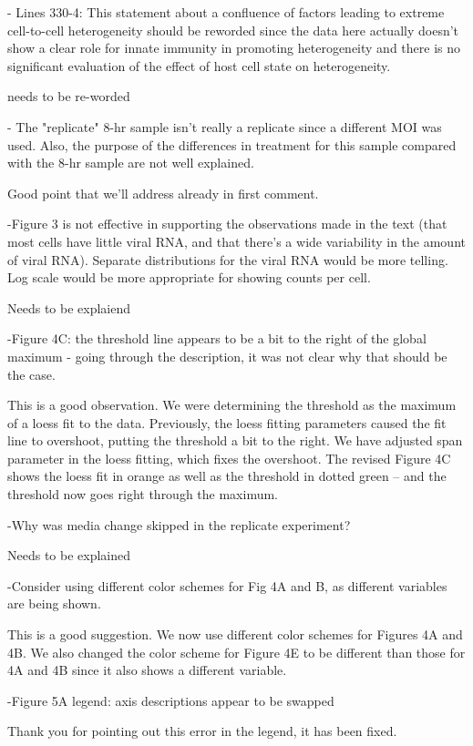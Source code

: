 \documentclass[11pt, oneside]{article}   	%
\begin{document}
- Lines 330-4: This statement about a confluence of factors leading to extreme cell-to-cell heterogeneity should be reworded since the data here actually doesn't show a clear role for innate immunity in promoting heterogeneity and there is no significant evaluation of the effect of host cell state on heterogeneity. 

{\color{red} needs to be re-worded}

- The "replicate" 8-hr sample isn't really a replicate since a different MOI was used. Also, the purpose of the differences in treatment for this sample compared with the 8-hr sample are not well explained. 

{\color{red}
Good point that we'll address already in first comment.}

-Figure 3 is not effective in supporting the observations made in the text (that most cells have little viral RNA, and that there's a wide variability in the amount of viral RNA). Separate distributions for the viral RNA would be more telling. Log scale would be more appropriate for showing counts per cell. 

{\color{red} Needs to be explaiend}

-Figure 4C: the threshold line appears to be a bit to the right of the global maximum - going through the description, it was not clear why that should be the case. 

{\color{black} 
This is a good observation. 
We were determining the threshold as the maximum of a loess fit to the data. 
Previously, the loess fitting parameters caused the fit line to overshoot, putting the threshold a bit to the right.
We have adjusted span parameter in the loess fitting, which fixes the overshoot.
The revised Figure 4C shows the loess fit in orange as well as the threshold in dotted green -- and the threshold now goes right through the maximum.
}

-Why was media change skipped in the replicate experiment? 

{\color{red} Needs to be explained}

-Consider using different color schemes for Fig 4A and B, as different variables are being shown. 

{\color{black} 
This is a good suggestion.
We now use different color schemes for Figures 4A and 4B.
We also changed the color scheme for Figure 4E to be different than those for 4A and 4B since it also shows a different variable.}

-Figure 5A legend: axis descriptions appear to be swapped

{\color{black}
Thank you for pointing out this error in the legend, it has been fixed.
}
\end{document}
